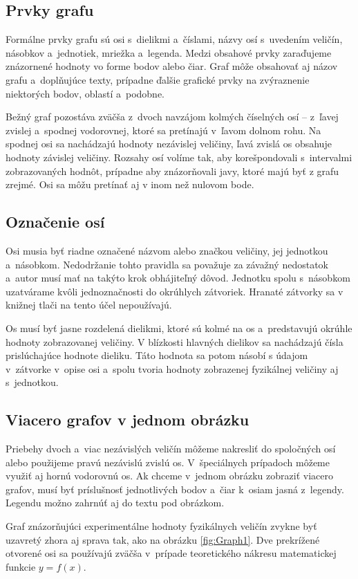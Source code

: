 \subsection{Prvky grafu}
Formálne prvky grafu sú osi s~dielikmi a~číslami,
názvy osí s~uvedením veličín, násobkov a~jednotiek,
mriežka a~legenda.
Medzi obsahové prvky zaraďujeme znázornené hodnoty vo forme
bodov alebo čiar.
Graf môže obsahovať aj názov grafu
a~doplňujúce texty,
prípadne ďalšie grafické prvky na zvýraznenie niektorých bodov,
oblastí a~podobne.

Bežný graf pozostáva zväčša z~dvoch navzájom kolmých číselných
osí – z~ľavej zvislej a~spodnej vodorovnej,
ktoré sa pretínajú v~ľavom dolnom rohu.
Na spodnej osi sa nachádzajú hodnoty nezávislej veličiny,
ľavá zvislá os obsahuje hodnoty závislej veličiny.
Rozsahy osí volíme tak,
aby korešpondovali s~intervalmi zobrazovaných hodnôt,
prípadne aby znázorňovali javy,
ktoré majú byť z grafu zrejmé.
Osi sa môžu pretínať aj v inom než nulovom bode.

\subsection{Označenie osí}
Osi musia byť riadne označené názvom alebo značkou veličiny,
jej jednotkou a~násobkom.
Nedodržanie tohto pravidla sa považuje za závažný nedostatok
a~autor musí mať na takýto krok obhájiteľný dôvod.
Jednotku spolu s~násobkom uzatvárame kvôli jednoznačnosti
do okrúhlych zátvoriek.
Hranaté zátvorky sa v knižnej tlači na tento účel nepoužívajú.

Os musí byť jasne rozdelená dielikmi,
ktoré sú kolmé na os a~predstavujú okrúhle hodnoty
zobrazovanej veličiny.
V blízkosti hlavných dielikov sa nachádzajú čísla prislúchajúce
hodnote dieliku.
Táto hodnota sa potom násobí s údajom v~zátvorke
v~opise osi a~spolu tvoria hodnoty zobrazenej fyzikálnej
veličiny aj s~jednotkou.

\subsection{Viacero grafov v jednom obrázku}
Priebehy dvoch a~viac nezávislých veličín môžeme nakresliť
do spoločných osí alebo použijeme pravú nezávislú zvislú os.
V~špeciálnych prípadoch môžeme využiť aj hornú vodorovnú os.
Ak chceme v~jednom obrázku zobraziť viacero grafov,
musí byť príslušnosť jednotlivých bodov a~čiar k~osiam jasná
z~legendy.
Legendu možno zahrnúť aj do textu pod obrázkom.

Graf znázorňujúci experimentálne hodnoty fyzikálnych veličín
zvykne byť uzavretý zhora aj sprava tak,
ako na obrázku \ref{fig:Graph1}.
Dve prekrížené otvorené osi sa používajú zväčša
v~prípade teoretického nákresu matematickej funkcie $y = f(x)$.


